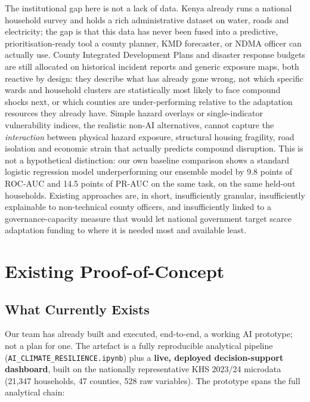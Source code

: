 \documentclass[12pt,a4paper]{article}
\begin{document}
The institutional gap here is not a lack of data. Kenya already runs a national household survey and holds a rich administrative dataset on water, roads and electricity; the gap is that this data has never been fused into a predictive, prioritisation-ready tool a county planner, KMD forecaster, or NDMA officer can actually use. County Integrated Development Plans and disaster response budgets are still allocated on historical incident reports and generic exposure maps, both reactive by design: they describe what has already gone wrong, not which specific wards and household clusters are statistically most likely to face compound shocks next, or which counties are under-performing relative to the adaptation resources they already have. Simple hazard overlays or single-indicator vulnerability indices, the realistic non-AI alternatives, cannot capture the \emph{interaction} between physical hazard exposure, structural housing fragility, road isolation and economic strain that actually predicts compound disruption. This is not a hypothetical distinction: our own baseline comparison shows a standard logistic regression model underperforming our ensemble model by 9.8 points of ROC-AUC and 14.5 points of PR-AUC on the same task, on the same held-out households. Existing approaches are, in short, insufficiently granular, insufficiently explainable to non-technical county officers, and insufficiently linked to a governance-capacity measure that would let national government target scarce adaptation funding to where it is needed most and available least.

\newpage
\section{Existing Proof-of-Concept}

\subsection{What Currently Exists}
Our team has already built and executed, end-to-end, a working AI prototype; not a plan for one. The artefact is a fully reproducible analytical pipeline (\texttt{AI\_CLIMATE\_RESILIENCE.ipynb}) plus a \textbf{live, deployed decision-support dashboard}, built on the nationally representative KHS 2023/24 microdata (21,347 households, 47 counties, 528 raw variables). The prototype spans the full analytical chain:
\end{document}
